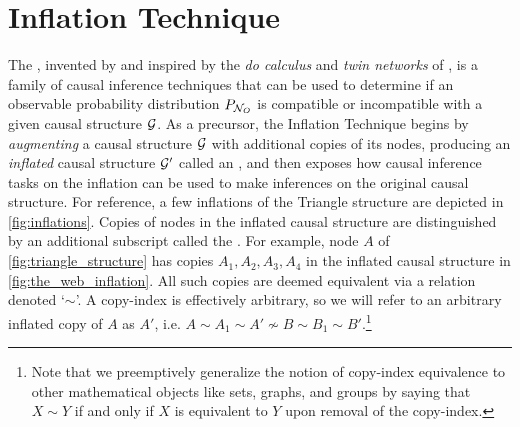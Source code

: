\documentclass[aps, 10pt, english, twoside, pra, nofootinbib, tightenlines, longbibliography, superscriptaddress]{revtex4-1}
\begin{document}
    \section{Inflation Technique}
    \label{sec:inflation_technique_summary}
    The , invented by \citet{Inflation} and inspired by the \textit{do calculus} and \textit{twin networks} of \citet{Pearl_2009}, is a family of causal inference techniques that can be used to determine if an observable probability distribution $\prob[\nodes_{O}]$ is compatible or incompatible with a given causal structure $\mathcal{G}$. As a precursor, the Inflation Technique begins by \textit{augmenting} a causal structure $\mathcal{G}$ with additional copies of its nodes, producing an \textit{inflated} causal structure $\mathcal{G}'$ called an , and then exposes how causal inference tasks on the inflation can be used to make inferences on the original causal structure. For reference, a few inflations of the Triangle structure are depicted in \cref{fig:inflations}. Copies of nodes in the inflated causal structure are distinguished by an additional subscript called the . For example, node $A$ of \cref{fig:triangle_structure} has copies $A_1, A_2, A_3, A_4$ in the inflated causal structure in \cref{fig:the_web_inflation}. All such copies are deemed equivalent via a  relation denoted `$\sim$'. A copy-index is effectively arbitrary, so we will refer to an arbitrary inflated copy of $A$ as $A'$, i.e. $A \sim A_1 \sim A' \not\sim B \sim B_1 \sim B'$.\footnote{Note that we preemptively generalize the notion of copy-index equivalence to other mathematical objects like sets, graphs, and groups by saying that $X \sim Y$ if and only if $X$ is equivalent to $Y$ upon removal of the copy-index.}
\end{document}
